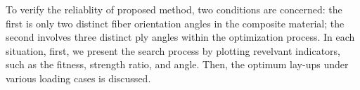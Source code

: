 To verify the reliablity of proposed method, two conditions are concerned: the
first is only two distinct fiber orientation angles in the composite material;
the second involves three distinct ply angles within the optimization process.
In each situation, first, we present the search process by plotting revelvant
indicators, such as the fitness, strength ratio, and angle. Then, the optimum
lay-ups under various loading cases is discussed.


